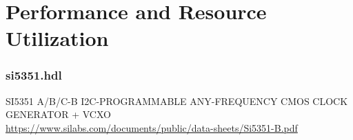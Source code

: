 \documentclass{article}
\def\comp{temp}
\def\comp{si5351}
\begin{document}
\section*{Performance and Resource Utilization}
\subsubsection*{\comp.hdl}

\begin{thebibliography}{1}

 SI5351 A/B/C-B I2C-PROGRAMMABLE ANY-FREQUENCY CMOS CLOCK GENERATOR + VCXO \\
\url{https://www.silabs.com/documents/public/data-sheets/Si5351-B.pdf}


\end{thebibliography}
\end{document}
